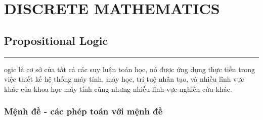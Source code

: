 \documentclass[11pt,fleqn]{book} %
\begin{document}

\part{DISCRETE MATHEMATICS} 
\label{discrete_mathematics}




\chapter{Propositional Logic}
    \Large
    \hrule
    \vspace*{2cm}
    \normalsize
    ogic là cơ sở của tất cả các suy luận toán học, nó được ứng dụng thực tiễn trong việc thiết kế hệ thống máy tính, máy học, trí tuệ nhân tạo,
    và nhiều lĩnh vực khác của khoa học máy tính cũng nhưng nhiều lĩnh vực nghiên cứu khác. 
    \pagebreak
    \section{Mệnh đề - các phép toán với mệnh đề}
\end{document}
